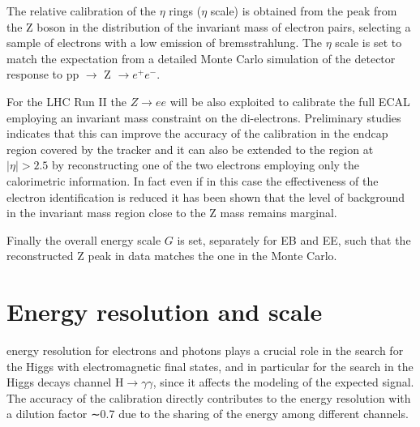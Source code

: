 \documentclass[journal]{IEEEtran}
\begin{document}
The relative calibration of the $\eta$ rings ($\eta$ scale) is obtained from the peak from the Z boson in the distribution of the invariant mass of electron pairs, selecting a sample of electrons with a low emission of bremsstrahlung. The $\eta$ scale is set to match the expectation from a detailed Monte Carlo simulation of the detector response to pp $\to$ Z $\to e^+e^-$. 

For the LHC Run II the $Z\to ee$ will be also exploited to calibrate the full ECAL employing an invariant mass constraint on the di-electrons. Preliminary studies indicates that this can improve the accuracy of the calibration in the endcap region covered by the tracker and it can also be extended to the region at $\vert\eta\vert>2.5$ by reconstructing one of the two electrons employing only the calorimetric information. In fact even if in this case the effectiveness of the electron identification is reduced it has been shown that the level of background in the invariant mass region close to the Z mass remains marginal.

Finally the overall energy scale $G$ is set, separately for EB and EE, such that the reconstructed Z peak in data matches the one in the Monte Carlo.


\section{Energy resolution and scale}
 energy resolution for electrons and photons plays a crucial role in the search for the Higgs with electromagnetic final states, and in particular for the search in the Higgs decays channel H$\to\gamma\gamma$, since it affects the modeling of the expected signal. The accuracy of the calibration directly contributes to the energy resolution with a dilution factor ∼0.7 due to the sharing of the energy among different channels. 
\end{document}
